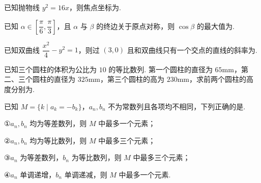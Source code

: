 \documentclass[a4paper,11pt]{report}
\begin{document}
\begin{examquestions}[start=11]
\item 已知抛物线 $y^2=16x$，则焦点坐标为\blank.
\item 已知 $\alpha\in\left[\dfrac\pi6,\dfrac\pi3\right]$，且 $\alpha$ 与 $\beta$ 的终边关于原点对称，则 $\cos\beta$ 的最大值为\blank.
\item 已知双曲线 $\dfrac{x^2}{4}-y^2=1$，则过 $(3,0)$ 且和双曲线只有一个交点的直线的斜率为\blank.
\item 已知三个圆柱的体积为公比为 $10$ 的等比数列. 第一个圆柱的直径为 $65\mathrm{mm}$，第二、三个圆柱的直径为 $325\mathrm{mm}$，第三个圆柱的高为 $230\mathrm{mm}$，求前两个圆柱的高度分别为\blank.
\item 已知 $M=\{k\mid a_k=-b_k\}$，$a_n,b_n$ 不为常数列且各项均不相同，下列正确的是\blank.

①$a_n,b_n$ 均为等差数列，则 $M$ 中最多一个元素；

②$a_n,b_n$ 均为等比数列，则 $M$ 中最多三个元素；

③$a_n$ 为等差数列，$b_n$ 为等比数列，则 $M$ 中最多三个元素；

④$a_n$ 单调递增，$b_n$ 单调递减，则 $M$ 中最多一个元素.
\end{examquestions}
\newpage
{}
\end{document}
